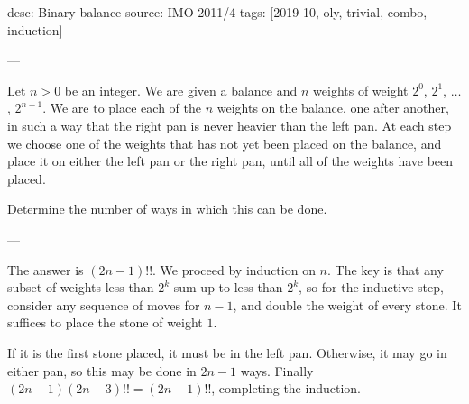 desc: Binary balance
source: IMO 2011/4
tags: [2019-10, oly, trivial, combo, induction]

---

Let $n>0$ be an integer. We are given a balance and $n$ weights of weight $2^0$, $2^1$, $\ldots$, $2^{n-1}$. We are to place each of the $n$ weights on the balance, one after another, in such a way that the right pan is never heavier than the left pan. At each step we choose one of the weights that has not yet been placed on the balance, and place it on either the left pan or the right pan, until all of the weights have been placed.

Determine the number of ways in which this can be done.

---

The answer is $(2n-1)!!$. We proceed by induction on $n$. The key is that any subset of weights less than $2^k$ sum up to less than $2^k$, so for the inductive step, consider any sequence of moves for $n-1$, and double the weight of every stone. It suffices to place the stone of weight $1$.

If it is the first stone placed, it must be in the left pan. Otherwise, it may go in either pan, so this may be done in $2n-1$ ways. Finally $(2n-1)(2n-3)!!=(2n-1)!!$, completing the induction.

